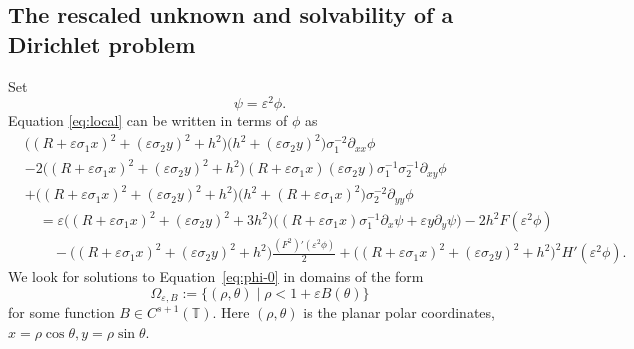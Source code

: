 \documentclass[12pt,reqno]{amsart}
\numberwithin{equation}{section}
\theoremstyle{definition}
\theoremstyle{remark}
\begin{document}
\subsection{The rescaled unknown and solvability of a Dirichlet problem}
Set
\begin{equation*}%
\psi=\varepsilon^2\phi.
\end{equation*}
 Equation   \eqref{eq:local}  can be written in terms of $\phi$ as
\begin{equation}\label{eq:phi-0}
\begin{split}
&\bigl((R+\varepsilon\sigma_1x)^2+(\varepsilon\sigma_2y)^2+h^2\bigr)\bigl(h^2+(\varepsilon\sigma_2y)^2\bigr)
 \sigma_1^{-2}\partial_{xx}\phi \\
&-2\bigl((R+\varepsilon\sigma_1x)^2+(\varepsilon\sigma_2y)^2+h^2\bigr)(R+\varepsilon\sigma_1x)(\varepsilon\sigma_2y)
 \sigma_1^{-1}\sigma_2^{-1}\partial_{xy}\phi\\
&+\bigl((R+\varepsilon\sigma_1x)^2+(\varepsilon\sigma_2y)^2+h^2\bigr)\bigl(h^2+(R+\varepsilon\sigma_1x)^2\bigr)
 \sigma_2^{-2}\partial_{yy}\phi\\
&\quad=\varepsilon\bigl((R+\varepsilon\sigma_1x)^2+(\varepsilon\sigma_2y)^2+3h^2\bigr)\bigl((R+\varepsilon\sigma_1x) \sigma_1^{-1}\partial_{x}\psi+\varepsilon y\partial_{y}\psi\bigr)-2h^2F(\varepsilon^2\phi)\\
&\qquad-\bigl((R+\varepsilon\sigma_1x)^2+(\varepsilon\sigma_2y)^2+h^2\bigr) \frac{\left(F^2\right)'(\varepsilon^2\phi)}{2}+\bigl((R+\varepsilon\sigma_1x)^2+(\varepsilon\sigma_2y)^2+h^2\bigr)^2 H'(\varepsilon^2\phi).
\end{split}
\end{equation} 
We look for solutions to Equation~\eqref{eq:phi-0} in domains of the form
\[
\varOmega_{\varepsilon, B} := \{ (\rho,\theta)\mid\rho < 1 + \varepsilon B(\theta) \}
\]
for some function $B\in C^{s+1}(\mathbb{T})$. Here $ (\rho,\theta) $ is the planar polar coordinates,   $ x=\rho\cos\theta, y=\rho\sin\theta $.  
\end{document}
